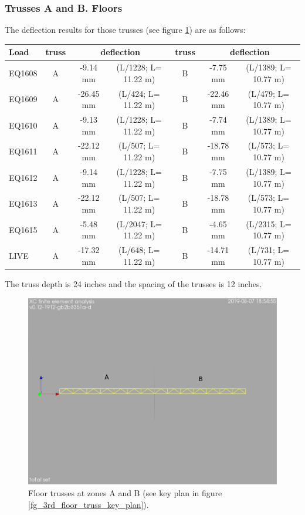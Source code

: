 \subsubsection{Trusses A and B. Floors}
The deflection results for those trusses (see figure \ref{fg_floor_truss_AB}) are as follows:

\begin{center}
  \begin{scriptsize}
  \begin{tabular}{|l|c|c|c|c|c|c|}
    \hline
    \textbf{Load} & \textbf{truss} & \multicolumn{2}{c|}{\textbf{deflection}} & \textbf{truss} & \multicolumn{2}{c|}{\textbf{deflection}} \\
    \hline
EQ1608 & A & -9.14 mm & (L/1228; L= 11.22 m)  & B & -7.75 mm & (L/1389; L= 10.77 m) \\
EQ1609 & A & -26.45 mm & (L/424; L= 11.22 m) & B & -22.46 mm & (L/479; L= 10.77 m) \\
EQ1610 & A & -9.13 mm & (L/1228; L= 11.22 m) & B & -7.74 mm & (L/1389; L= 10.77 m) \\
EQ1611 & A & -22.12 mm & (L/507; L= 11.22 m) & B & -18.78 mm & (L/573; L= 10.77 m) \\
EQ1612 & A & -9.14 mm & (L/1228; L= 11.22 m) & B & -7.75 mm & (L/1389; L= 10.77 m) \\
EQ1613 & A & -22.12 mm & (L/507; L= 11.22 m) & B & -18.78 mm & (L/573; L= 10.77 m) \\
EQ1615 & A & -5.48 mm & (L/2047; L= 11.22 m) & B & -4.65 mm & (L/2315; L= 10.77 m) \\
LIVE & A & -17.32 mm & (L/648; L= 11.22 m) & B & -14.71 mm & (L/731; L= 10.77 m) \\
\hline
  \end{tabular}
  \end{scriptsize}
\end{center}
\noindent The truss depth is 24 inches and the spacing of the trusses is 12 inches.
\begin{figure}
  \begin{center}
  \includegraphics[width=120mm]{figures/floor_truss_AB}
  \end{center}
  \caption{Floor trusses at zones A and B (see key plan in figure \ref{fg_3rd_floor_truss_key_plan}).}\label{fg_floor_truss_AB}
\end{figure}

